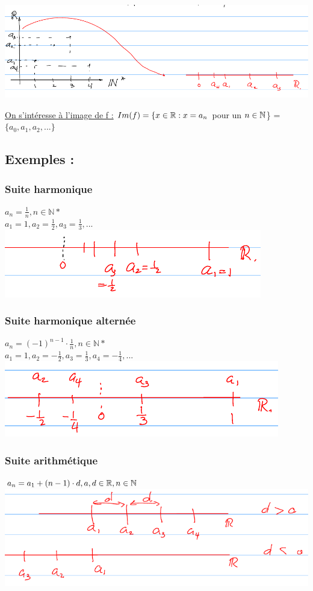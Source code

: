 \documentclass[12pt,a4paper]{article}
\begin{document}
{\includegraphics[scale=0.65]{illustrations_Analyse/graphe_suite}

\underline{On s'intéresse à l'image de f :} $Im(f) = \{x \in \mathbb{R} : x = a_n$ pour un $n \in \mathbb{N}$\} = $\{a_0,a_1,a_2,...\}$
\subsection{Exemples :}
\subsubsection{Suite harmonique}
$a_n = \frac{1}{n}, n \in  \mathbb{N*}$\\
$a_1 = 1, a_2 = \frac{1}{2}, a_3 = \frac{1}{3},...$\\
\includegraphics[scale=1]{illustrations_Analyse/suite_harmonique}
\subsubsection{Suite harmonique alternée}
$a_n = (-1)^{n-1}\cdot\frac{1}{n}, n \in \mathbb{N*}$\\
$a_1 = 1, a_2 = -\frac{1}{2}, a_3 = \frac{1}{3}, a_4 = -\frac{1}{4},...$\\
\includegraphics[scale=1]{illustrations_Analyse/suite_harmonique_alternee}
\subsubsection{Suite arithmétique}
$a_n  =a_1 + (n-1)\cdot d, a,d \in\mathbb{R}, n \in \mathbb{N}$\\
\includegraphics[scale=1]{illustrations_Analyse/suite_arithmetique}
}
\end{document}
